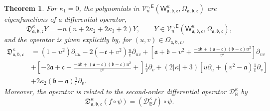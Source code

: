 \documentclass{amsart}
\newtheorem{thm}{Theorem}[section]
\theoremstyle{remark}
\def\sE{{\mathsf E}}
\def\sW{{\mathsf W}}
\def\fa{{\mathfrak a}}
\def\fb{{\mathfrak b}}
\def\fc{{\mathfrak c}}
\def\fD{{\mathfrak D}}
\def\k{{\kappa}}
\def\CD{{\mathcal D}}
\def\CV{{\mathcal V}}
\def\BB{{\mathbb B}}
\begin{document}
\begin{thm}\label{thm:PDE_d=2}
For $\k_1 =0$, the polynomials in $\CV_n^{\circ, \sE}(\sW_{\fa,\fb,\fc}^\k, \Omega_{\fa,\fb,\fc})$ 
are eigenfunctions of a differential operator, 
\begin{equation} \label{eq:spectral}
    \fD_{\fa,\fb,\fc}^\k Y = -n(n+ 2\k_2+2\k_3+ 2) Y, \qquad Y \in \CV_n^{\circ, \sE}(\sW_{\fa,\fb,\fc}^\k, \Omega_{\fa,\fb,\fc}),
\end{equation} 
and the operator is given explicitly by, for $(u,v) \in \Omega_{\fa,\fb,\fc}$, 
\begin{align*}
 \fD_{\fa,\fb,\fc}^\k \, & = (1-u^2) \partial_{uu} - 2(-\fc+v^2) \frac{u}{v} \partial_{u v} + \left[ \fa + \fb - v^2
       + \frac{- \fa \fb + (\fa - \fc) (\fb - \fc) u^2}{v^2}\right]\partial_{vv}\\
  & + \left[ -2\fa + \fc -\frac{- \fa \fb + (\fa - \fc) (\fb - \fc) u^2}{v^2} + \right]\frac{1}{v}\partial_{v} 
    + (2|\k|+3) \left[ u \partial_u + (v^2-\fa)\frac{1}{v}\partial_{v}\right]\\
  &  + 2 \k_2 (\fb-\fa) \frac{1}{v} \partial_v. 
\end{align*}
Moreover, the operator is related to the second-order differential operator $\CD_{\BB}^\k$ by 
\begin{equation} \label{eq:fD=D}
        \fD_{\fa,\fb,\fc}^\k (f\circ \psi) = \left(\CD_\BB^\k f \right) \circ \psi.   
\end{equation}
\end{thm} 
 
\end{document}
